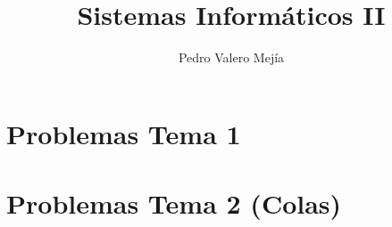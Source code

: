 \documentclass{article}
\author{Pedro Valero Mejía}
\title{Sistemas Informáticos II}
\begin{document}
\maketitle

\section{Problemas Tema 1}

\section{Problemas Tema 2 (Colas)}

\end{document}
